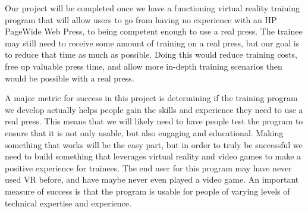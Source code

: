 \documentclass[10pt,draftclsnofoot,onecolumn]{IEEEtran}
\begin{document}
Our project will be completed once we have a functioning virtual reality training program that will allow users to go from having no experience with an HP PageWide Web Press, to being competent enough to use a real press. The trainee may still need to receive some amount of training on a real press, but our goal is to reduce that time as much as possible. Doing this would reduce training costs, free up valuable press time, and allow more in-depth training scenarios then would be possible with a real press.
\bigskip
\par A major metric for success in this project is determining if the training program we develop actually helps people gain the skills and experience they need to use a real press. This means that we will likely need to have people test the program to ensure that it is not only usable, but also engaging and educational. Making something that works will be the easy part, but in order to truly be successful we need to build something that leverages virtual reality and video games to make a positive experience for trainees. The end user for this program may have never used VR before, and have maybe never even played a video game. An important measure of success is that the program is usable for people of varying levels of technical expertise and experience.
\end{document}
